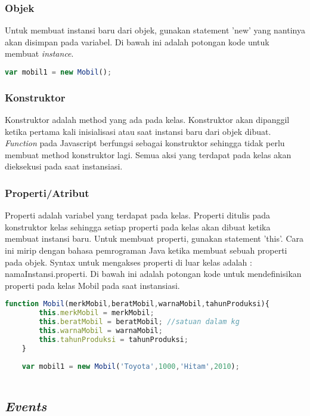 \subsubsection{Objek}
Untuk membuat instansi baru dari objek, gunakan statement 'new' yang nantinya akan disimpan pada variabel. Di bawah ini adalah potongan kode untuk membuat \textit{instance}.

\begin{lstlisting}[language=Javascript, caption=Membuat \textit{instance} mobil]
	var mobil1 = new Mobil();
\end{lstlisting}

\subsubsection{Konstruktor}
Konstruktor adalah method yang ada pada kelas. Konstruktor akan dipanggil ketika pertama kali inisialisasi atau saat instansi baru dari objek dibuat. \textit{Function} pada Javascript berfungsi sebagai konstruktor sehingga tidak perlu membuat method konstruktor lagi. Semua aksi yang terdapat pada kelas akan dieksekusi pada saat instansiasi.

\subsubsection{Properti/Atribut}
Properti adalah variabel yang terdapat pada kelas. Properti ditulis pada konstruktor kelas sehingga setiap properti pada kelas akan dibuat ketika membuat instansi baru. Untuk membuat properti, gunakan statement 'this'. Cara ini mirip dengan bahasa pemrograman Java ketika membuat sebuah properti pada objek. Syntax untuk mengakses properti di luar kelas adalah : namaInstansi.properti. Di bawah ini adalah potongan kode untuk mendefinisikan properti pada kelas Mobil pada saat instansiasi.

\begin{lstlisting}[language=Javascript, caption=Mendefinisikan properti pada kelas Mobil]
	function Mobil(merkMobil,beratMobil,warnaMobil,tahunProduksi){
		this.merkMobil = merkMobil;
		this.beratMobil = beratMobil; //satuan dalam kg
		this.warnaMobil = warnaMobil;
		this.tahunProduksi = tahunProduksi;
	}
	
	var mobil1 = new Mobil('Toyota',1000,'Hitam',2010);
	
\end{lstlisting}


\subsection{\textit{Events}}


